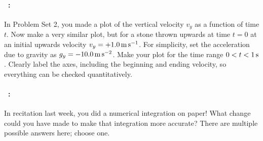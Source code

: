 \documentclass[12pt]{article}
\begin{document}
\vfill

\paragraph{\problemname~\theproblem:}%
In Problem Set 2, you made a plot of the vertical velocity $v_y$ as a
function of time $t$. Now make a very similar plot, but for a stone
thrown upwards at time $t=0$ at an initial upwards velocity
$v_y=+1.0\,\mathrm{m}\,\mathrm{s}^{-1}$. For simplicity, set the acceleration due to
gravity as $g_y=-10.0\,\mathrm{m}\,\mathrm{s}^{-2}$. Make your plot for the time range
$0<t<1\,\mathrm{s}$. Clearly label the axes, including the beginning and
ending velocity, so everything can be checked quantitatively.

\vfill

\paragraph{\problemname~\theproblem:}%
In recitation last week, you did a numerical integration on
paper! What change could you have made to make that integration more
accurate? There are multiple possible answers here; choose one.

\vfill
~
\end{document}
